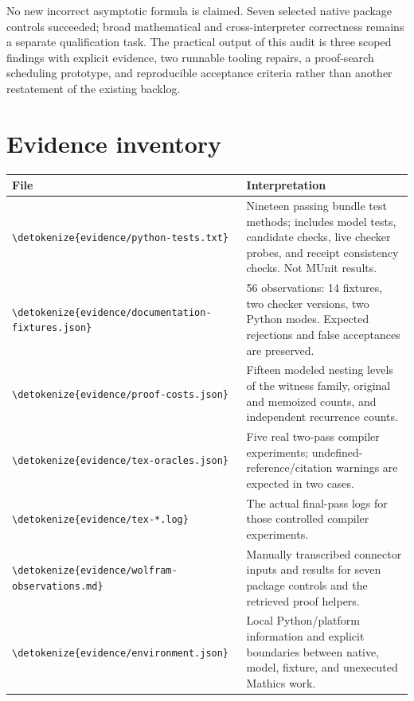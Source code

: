\documentclass[11pt,letterpaper]{article}
\newcommand{\code}[1]{\expandafter\nolinkurl\expandafter{\detokenize{#1}}}
\begin{document}
{No new incorrect asymptotic formula is claimed. Seven selected native package controls succeeded; broad mathematical and cross-interpreter correctness remains a separate qualification task. The practical output of this audit is three scoped findings with explicit evidence, two runnable tooling repairs, a proof-search scheduling prototype, and reproducible acceptance criteria rather than another restatement of the existing backlog.

\appendix
\section{Evidence inventory}

\begin{center}\small
\begin{tabularx}{\textwidth}{@{}p{2.55in}Y@{}}
\toprule
File & Interpretation\\
\midrule
\code{evidence/python-tests.txt} & Nineteen passing bundle test methods; includes model tests, candidate checks, live checker probes, and receipt consistency checks. Not MUnit results.\\
\code{evidence/documentation-fixtures.json} & 56 observations: 14 fixtures, two checker versions, two Python modes. Expected rejections and false acceptances are preserved.\\
\code{evidence/proof-costs.json} & Fifteen modeled nesting levels of the witness family, original and memoized counts, and independent recurrence counts.\\
\code{evidence/tex-oracles.json} & Five real two-pass compiler experiments; undefined-reference/citation warnings are expected in two cases.\\
\code{evidence/tex-*.log} & The actual final-pass logs for those controlled compiler experiments.\\
\code{evidence/wolfram-observations.md} & Manually transcribed connector inputs and results for seven package controls and the retrieved proof helpers.\\
\code{evidence/environment.json} & Local Python/platform information and explicit boundaries between native, model, fixture, and unexecuted Mathics work.\\
\bottomrule
\end{tabularx}
\end{center}

}
\end{document}
